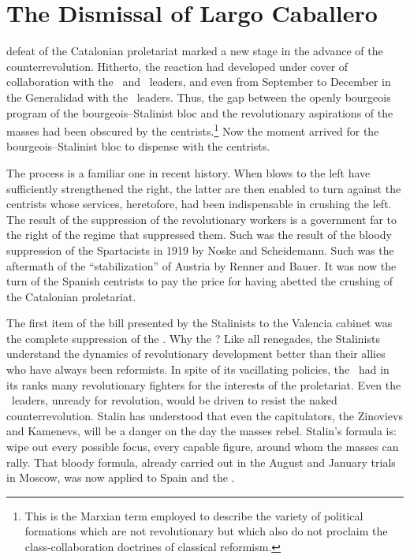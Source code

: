 \chapter{The Dismissal of Largo Caballero}

 defeat of the Catalonian proletariat marked a new stage in the advance of the counterrevolution. Hitherto, the reaction had developed under cover of collaboration with the \CNT\ and \UGT\ leaders, and even from September to December in the Generalidad with the \POUM\ leaders. Thus, the gap between the openly bourgeois program of the bourgeois--Stalinist bloc and the revolutionary aspirations of the masses had been obscured by the centrists.\kn\kn\footnote{\kp\kp This is the Marxian term employed to describe the variety of political formations which are not revolutionary but which also do not proclaim the class-collaboration doctrines of classical reformism.} Now the moment arrived for the bourgeois--Stalinist bloc to dispense with the centrists.

The process is a familiar one in recent history. When blows to the left have sufficiently strengthened the right, the latter are then enabled to turn against the centrists whose services, heretofore, had been indispensable in crushing the left. The result of the suppression of the revolutionary workers is a government far to the right of the regime that suppressed them. Such was the result of the bloody suppression of the Spartacists in 1919 by Noske and Scheidemann. Such was the aftermath of the ``stabilization'' of Austria by Renner and Bauer. It was now the turn of the Spanish centrists to pay the price for having abetted the crushing of the Catalonian proletariat.

The first item of the bill presented by the Stalinists to the Valencia cabinet was the complete suppression of the \POUM. Why the \POUM? Like all renegades, the Stalinists understand the dynamics of revolutionary development better than their allies who have always been reformists. In spite of its vacillating policies, the \POUM\ had in its ranks many revolutionary fighters for the interests of the proletariat. Even the \POUM\ leaders, unready for revolution, would be driven to resist the naked counterrevolution. Stalin has understood that even the capitulators, the Zinovievs and Kamenevs, will be a danger on the day the masses rebel. Stalin’s formula is: wipe out every possible focus, every capable figure, around whom the masses can rally. That bloody formula, already carried out in the August and January trials in Moscow, was now applied to Spain and the \POUM\kn.


